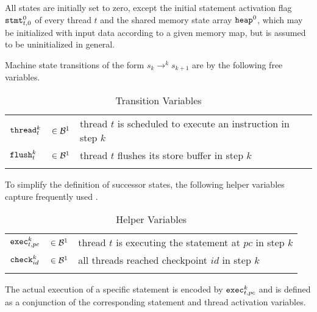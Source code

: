 All states are initially set to zero, except the initial statement activation flag $\STMT^0_{t, 0}$ of every thread $t$ and the shared memory state array $\HEAP^0$, which may be initialized with input data according to a given memory map, but is assumed to be uninitialized in general.

\bigskip

Machine state transitions of the form $s_k \to^k s_{k + 1}$ are  by the following free variables.

\begin{longtabu}{llX}
  \firsthline
  $\THREAD^k_t$ & $\in \BVSORT[1]$ & thread $t$ is scheduled to execute an instruction in step $k$ \\
  $\FLUSH^k_t$ & $\in \BVSORT[1]$ & thread $t$ flushes its store buffer in step $k$ \\
  \lasthline
  \caption{Transition Variables}
  \label{tbl:encoding:transitions}
\end{longtabu}

To simplify the definition of successor states, the following helper variables capture frequently used .

\begin{longtabu}{llX}
  \firsthline
  $\EXEC^k_{t, pc}$ & $\in \BVSORT[1]$ & thread $t$ is executing the statement at $pc$ in step $k$ \\
  $\CHECK^k_{id}$ & $\in \BVSORT[1]$ & all threads reached checkpoint $id$ in step $k$ \\
  \lasthline
  \caption{Helper Variables}
\end{longtabu}

The actual execution of a specific statement is encoded by $\EXEC^k_{t, pc}$ and
is defined as a conjunction of the corresponding statement and thread activation variables.

